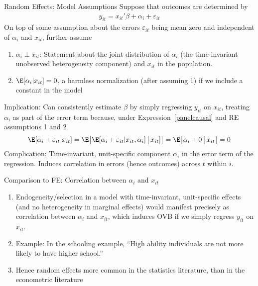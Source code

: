 \documentclass[aspectratio=169, handout]{beamer}
\begin{document}
{\footnotesize
\begin{frame}{Random Effects: Model Assumptions}
Suppose that outcomes are determined by
\begin{align}
  y_{it}
  = x_{it}'\beta
  + \alpha_i
  + \varepsilon_{it}
\end{align}
On top of some assumption about the errors $\varepsilon_{it}$ being mean
zero and independent of $\alpha_i$ and $x_{it}$, further assume
\begin{enumerate}
  \item $\alpha_i\perp x_{it}$: Statement about the joint
    distribution of $\alpha_i$ (the time-invariant unobserved
    heterogeneity component) and $x_{it}$ in the population.

  \item $\E[\alpha_i|x_{it}]=0$, a harmless normalization (after
    assuming 1) if we include a constant in the model
\end{enumerate}
\pause
\alert{Implication}:
Can consistently estimate $\beta$ by simply regressing $y_{it}$ on
$x_{it}$, treating $\alpha_i$ as part of the error term because,
under Expression~\ref{panelcausal} and RE assumptions 1 and 2
\begin{align*}
  \E[\alpha_i + \varepsilon_{it}|x_{it}]
  =
  \E\big[\E[\alpha_i + \varepsilon_{it}|x_{it},\alpha_i]\, \big|\,x_{it}]\big]
  =
  \E\big[\alpha_i + 0\,\big|\,x_{it}\big]
  =
  0
\end{align*}
\pause
\alert{Complication}:
Time-invariant, unit-specific component $\alpha_i$ in the error term of
the regression.
Induces correlation in errors (hence outcomes)
across $t$ within $i$.
\end{frame}
}


{\footnotesize
\begin{frame}{Comparison to FE: Correlation between $\alpha_i$ and $x_{it}$}

\begin{enumerate}
  \item Endogeneity/selection in a model with time-invariant,
    unit-specific effects (and no heterogeneity in marginal effects)
    would manifest \alert{precisely} as correlation between $\alpha_i$
    and $x_{it}$, which induces OVB if we simply regress $y_{it}$ on
    $x_{it}$.
  \item
    Example: In the schooling example, ``High ability individuals are
    not more likely to have higher school.''
  \item
    Hence random effects more common in the statistics literature, than
    in the econometric literature
\end{enumerate}
\end{frame}
}
\end{document}
